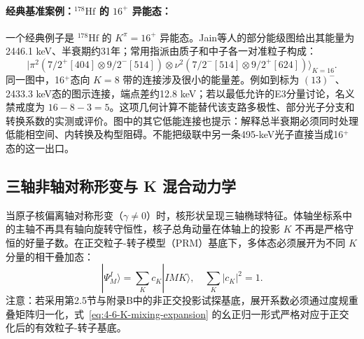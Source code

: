 \paragraph{经典基准案例：$^{178}\mathrm{Hf}$ 的 $16^+$ 异能态：}
一个经典例子是 $^{178}\mathrm{Hf}$ 的 $K^\pi=16^+$ 异能态。Jain等人的部分能级图给出其能量为2446.1 keV、半衰期约31年；常用指派由质子和中子各一对准粒子构成：~\cite{book-jain-nuclear-isomers}
\begin{equation}\label{eq:4-6-178hf-config}
|\pi^2(7/2^+[404] \otimes 9/2^-[514]) \otimes \nu^2(7/2^-[514] \otimes 9/2^+[624])\rangle_{K=16}.
\end{equation}
同一图中，16$^+$态向 $K=8$ 带的连接涉及很小的能量差。例如到标为 $(13)^-$、2433.3 keV态的图示连接，端点差约12.8 keV；若以最低允许的E3分量讨论，名义禁戒度为 $16-8-3=5$。这项几何计算不能替代该支路多极性、部分光子分支和转换系数的实测或评价。图中的其它低能连接也提示：解释总半衰期必须同时处理低能相空间、内转换及构型阻碍。不能把级联中另一条495-keV光子直接当成16$^+$态的这一出口。

\subsection{三轴非轴对称形变与 K 混合动力学}\label{sec:4-6-3}

当原子核偏离轴对称形变（$\gamma \ne 0$）时，核形状呈现三轴椭球特征。体轴坐标系中的主轴不再具有轴向旋转守恒性，核子总角动量在体轴上的投影 $K$ 不再是严格守恒的好量子数。在正交粒子-转子模型（PRM）基底下，多体态必须展开为不同 $K$ 分量的相干叠加态：
\begin{equation}\label{eq:4-6-K-mixing-expansion}
|\Psi_M^I\rangle = \sum_{K} c_K |I M K\rangle, \quad \sum_K |c_K|^2 = 1.
\end{equation}
注意：若采用第2.5节与附录B中的非正交投影试探基底，展开系数必须通过度规重叠矩阵归一化，式~\eqref{eq:4-6-K-mixing-expansion} 的幺正归一形式严格对应于正交化后的有效粒子-转子基底。

